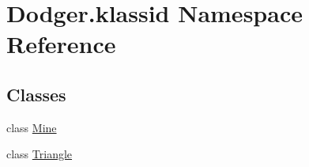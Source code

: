 \hypertarget{namespace_dodger_1_1klassid}{}\section{Dodger.\+klassid Namespace Reference}
\label{namespace_dodger_1_1klassid}
\subsection*{Classes}
\begin{DoxyCompactItemize}
\item 
class \hyperlink{class_dodger_1_1klassid_1_1_mine}{Mine}
\item 
class \hyperlink{class_dodger_1_1klassid_1_1_triangle}{Triangle}
\end{DoxyCompactItemize}
